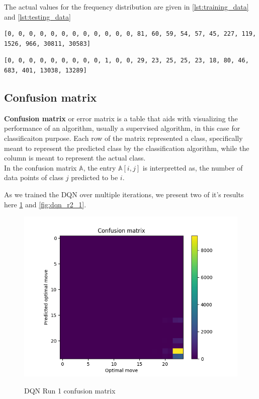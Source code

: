 The actual values for the frequency distribution are given in \ref{lst:training_data} and \ref{lst:testing_data}

\begin{lstlisting}[caption= Frequencies of optimal move in training data, label={lst:training_data}]
[0, 0, 0, 0, 0, 0, 0, 0, 0, 0, 0, 0, 81, 60, 59, 54, 57, 45, 227, 119, 1526, 966, 30811, 30583]
\end{lstlisting}
\begin{lstlisting}[caption= Frequencies of optimal move in testing data, label={lst:testing_data}]
[0, 0, 0, 0, 0, 0, 0, 0, 0, 1, 0, 0, 29, 23, 25, 25, 23, 18, 80, 46, 683, 401, 13038, 13289]
\end{lstlisting}


\subsection{Confusion matrix}
\textbf{Confusion matrix} or error matrix is a table that aids with visualizing the performance of an algorithm, usually a supervised algorithm, in this case for classificaiton purpose. Each row of the matrix represented a class, specifically meant to represent the predicted class by the classification algorithm, while the column is meant to represent the actual class. \\
In the confusion matrix $\mathbb{A}$, the entry $\mathbb{A}[i,j]$ is interpretted as, the number of data points of class $j$ predicted to be $i$.
\par As we trained the DQN over multiple iterations, we present two of it's results here \ref{fig:dqn_r1_1} and \ref{fig:dqn_r2_1}.

\begin{figure}
\centering
\includegraphics[scale=1]{cm1.png}\\
\caption{DQN Run 1 confusion matrix}
\label{fig:dqn_r1_1}
\end{figure}


